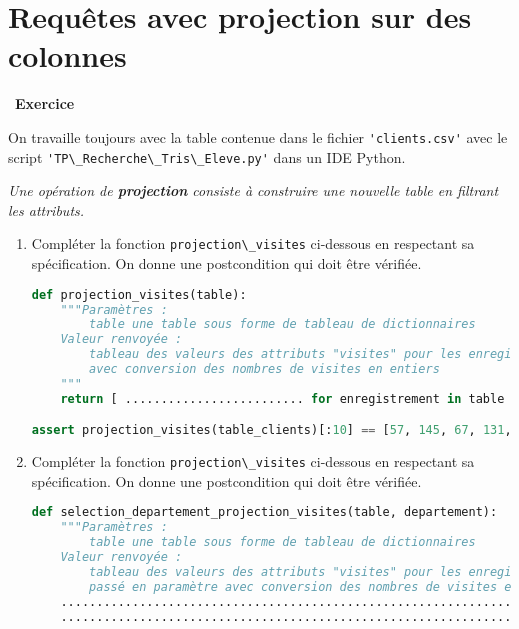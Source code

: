 \documentclass[
  11pt,
]{article}
\newcommand{\passthrough}[1]{#1}
\newcounter{exo}
\newenvironment{exercice}[1]
{\par \medskip   \addtocounter{exo}{1} \noindent  
\begin{bclogo}[arrondi =0.1,   noborder = true, logo=\bccrayon, marge=4]{~\textbf{Exercice} \textbf{\theexo} {\itshape #1} }  \par}
{
\end{bclogo}
 \par \bigskip }
\newcounter{def}
\begin{document}
\hypertarget{requuxeates-avec-projection-sur-des-colonnes}{%
\section{Requêtes avec projection sur des
colonnes}\label{requuxeates-avec-projection-sur-des-colonnes}}

\begin{exercice}{}

On travaille toujours avec la table contenue dans le fichier
\passthrough{\lstinline!'clients.csv'!} avec le script
\passthrough{\lstinline!'TP\_Recherche\_Tris\_Eleve.py'!} dans un IDE
Python.

\emph{Une opération de \textbf{projection} consiste à construire une
nouvelle table en filtrant les attributs.}

\begin{enumerate}
\def\labelenumi{\arabic{enumi}.}
\item
  Compléter la fonction \passthrough{\lstinline!projection\_visites!}
  ci-dessous en respectant sa spécification. On donne une postcondition
  qui doit être vérifiée.

\begin{lstlisting}[language=Python]
def projection_visites(table):
    """Paramètres : 
        table une table sous forme de tableau de dictionnaires
    Valeur renvoyée :
        tableau des valeurs des attributs "visites" pour les enregistrements de table
        avec conversion des nombres de visites en entiers
    """
    return [ ......................... for enregistrement in table ]

assert projection_visites(table_clients)[:10] == [57, 145, 67, 131, 76, 52, 65, 3, 101, 18]
\end{lstlisting}
\item
  Compléter la fonction \passthrough{\lstinline!projection\_visites!}
  ci-dessous en respectant sa spécification. On donne une postcondition
  qui doit être vérifiée.

\begin{lstlisting}[language=Python]
def selection_departement_projection_visites(table, departement):
    """Paramètres : 
        table une table sous forme de tableau de dictionnaires
    Valeur renvoyée :
        tableau des valeurs des attributs "visites" pour les enregistrements de table du département
        passé en paramètre avec conversion des nombres de visites en entiers"""
    ...................................................................
    ...................................................................


\end{lstlisting}
\end{enumerate}
\end{exercice}
\end{document}

